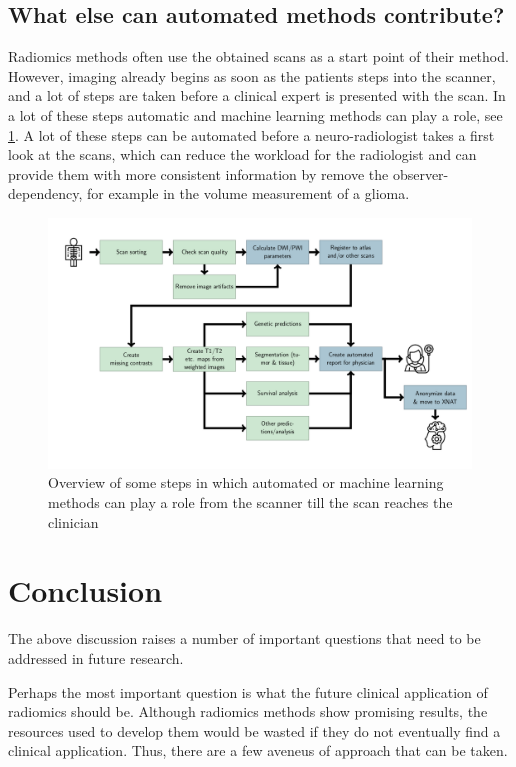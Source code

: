 \subsection{What else can automated methods contribute?}

Radiomics methods often use the obtained scans as a start point of their method.
However, imaging already begins as soon as the patients steps into the scanner, and a lot of steps are taken before a clinical expert is presented with the scan.
In a lot of these steps automatic and machine learning methods can play a role, see \cref{fig:discussion_pipeline_automatic}.
A lot of these steps can be automated before a neuro-radiologist takes a first look at the scans, which can reduce the workload for the radiologist and can provide them with more consistent information by remove the observer-dependency, for example in the volume measurement of a \gls{glioma}.


\begin{figure}[htbp]
\includegraphics[width=\textwidth]{Figures/Pipeline.png}
\caption{Overview of some steps in which automated or machine learning methods can play a role from the scanner till the scan reaches the clinician}\label{fig:discussion_pipeline_automatic}
\end{figure}



\section{Conclusion}\label{sec:discussion_conclusion}


The above discussion raises a number of important questions that need to be addressed in future research.

Perhaps the most important question is what the future clinical application of radiomics should be.
Although radiomics methods show promising results, the resources used to develop them would be wasted if they do not eventually find a clinical application.
Thus, there are a few aveneus of approach that can be taken.

